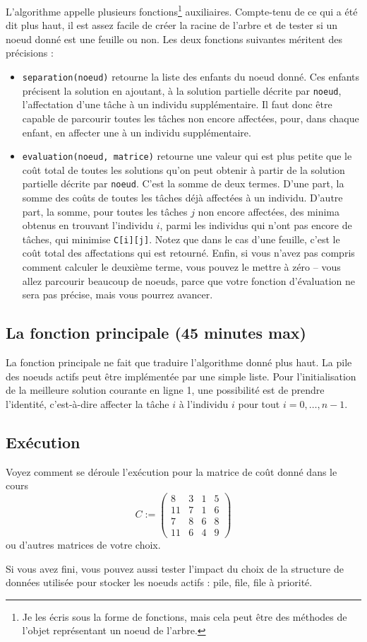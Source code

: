 \documentclass[a4paper,francais]{article}
\theoremstyle{definition}
\begin{document}
L'algorithme appelle plusieurs fonctions\footnote{Je les écris sous la forme de fonctions, mais cela peut être des méthodes de l'objet représentant un noeud de l'arbre.} auxiliaires. Compte-tenu de ce qui a été dit plus haut, il est assez facile de créer la racine de l'arbre et de tester si un noeud donné est une feuille ou non. Les deux fonctions suivantes méritent des précisions :
\begin{itemize}
\item \verb+separation(noeud)+ retourne la liste des enfants du noeud donné. Ces enfants précisent la solution en ajoutant, à la solution partielle décrite par \verb+noeud+, l'affectation d'une tâche à un individu supplémentaire. Il faut donc être capable de parcourir toutes les tâches non encore affectées, pour, dans chaque enfant, en affecter une à un individu supplémentaire. 
\item \verb+evaluation(noeud, matrice)+ retourne une valeur qui est plus petite que le coût total de toutes les solutions qu'on peut obtenir à partir de la solution partielle décrite par \verb+noeud+. C'est la somme de deux termes. D'une part, la somme des coûts de toutes les tâches déjà affectées à un individu. D'autre part, la somme, pour toutes les tâches $j$ non encore affectées, des minima obtenus en trouvant l'individu $i$, parmi les individus qui n'ont pas encore de tâches, qui minimise \verb+C[i][j]+. Notez que dans le cas d'une feuille, c'est le coût total des affectations qui est retourné. Enfin, si vous n'avez pas compris comment calculer le deuxième terme, vous pouvez le mettre à zéro -- vous allez parcourir beaucoup de noeuds, parce que votre fonction d'évaluation ne sera pas précise, mais vous pourrez avancer.    
\end{itemize}

\subsection{La fonction principale (45 minutes max)}

La fonction principale ne fait que traduire l'algorithme donné plus haut.
La pile des noeuds actifs peut être implémentée par une simple liste.
Pour l'initialisation de la meilleure solution courante en ligne 1,
une possibilité est de prendre l'identité,
c'est-à-dire affecter la tâche $i$ à l'individu $i$
pour tout $i=0,\dots,n-1$. 

\subsection{Exécution}

Voyez comment se déroule l'exécution pour la matrice de coût donné dans le cours
    \[ C := \left(
    \begin{array}{cccc}
      8 & 3 & 1 & 5 \\
      11 & 7 & 1 & 6 \\
      7 & 8 & 6 & 8 \\
      11 & 6 & 4 & 9 
    \end{array}
    \right) \]
ou d'autres matrices de votre choix.

Si vous avez fini, vous pouvez aussi tester l'impact du choix de la structure de données utilisée
pour stocker les noeuds actifs : pile, file, file à priorité.   
\end{document}

